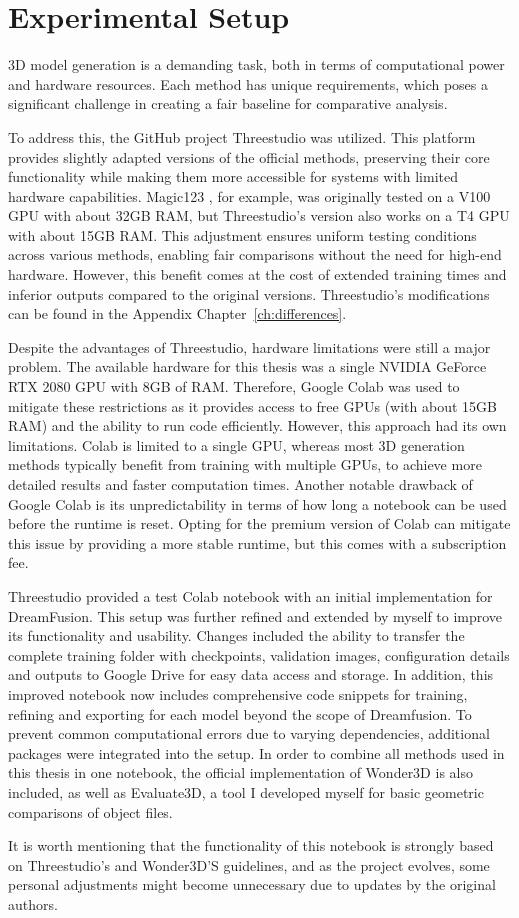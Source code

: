 \section{Experimental Setup}\label{Setup}

3D model generation is a demanding task, both in terms of computational power and hardware resources. Each method has unique requirements, which poses a significant challenge in creating a fair baseline for comparative analysis.

To address this, the GitHub project Threestudio \citep{threestudio2023} was utilized. This platform provides slightly adapted versions of the official methods, preserving their core functionality while making them more accessible for systems with limited hardware capabilities. Magic123 \citep{qian2023magic123}, for example, was originally tested on a V100 GPU with about 32GB RAM, but Threestudio's version also works on a T4 GPU with about 15GB RAM\@. This adjustment ensures uniform testing conditions across various methods, enabling fair comparisons without the need for high-end hardware. However, this benefit comes at the cost of extended training times and inferior outputs compared to the original versions. Threestudio's modifications can be found in the Appendix Chapter~\ref{ch:differences}.

Despite the advantages of Threestudio, hardware limitations were still a major problem. The available hardware for this thesis was a single NVIDIA GeForce RTX 2080 GPU with 8GB of RAM\@. Therefore, Google Colab \citep{googlecolab} was used to mitigate these restrictions as it provides access to free GPUs (with about 15GB RAM) and the ability to run code efficiently. However, this approach had its own limitations. Colab is limited to a single GPU, whereas most 3D generation methods typically benefit from training with multiple GPUs, to achieve more detailed results and faster computation times. Another notable drawback of Google Colab is its unpredictability in terms of how long a notebook can be used before the runtime is reset. Opting for the premium version of Colab can mitigate this issue by providing a more stable runtime, but this comes with a subscription fee.

Threestudio provided a test Colab notebook with an initial implementation for DreamFusion. This setup was further refined and extended by myself to improve its functionality and usability. Changes included the ability to transfer the complete training folder with checkpoints, validation images, configuration details and outputs to Google Drive for easy data access and storage. In addition, this improved notebook now includes comprehensive code snippets for training, refining and exporting for each model beyond the scope of Dreamfusion. To prevent common computational errors due to varying dependencies, additional packages were integrated into the setup. In order to combine all methods used in this thesis in one notebook, the official implementation of Wonder3D \citep{long2023wonder3d} is also included, as well as Evaluate3D, a tool I developed myself for basic geometric comparisons of object files.

It is worth mentioning that the functionality of this notebook is strongly based on Threestudio's and Wonder3D'S guidelines, and as the project evolves, some personal adjustments might become unnecessary due to updates by the original authors.